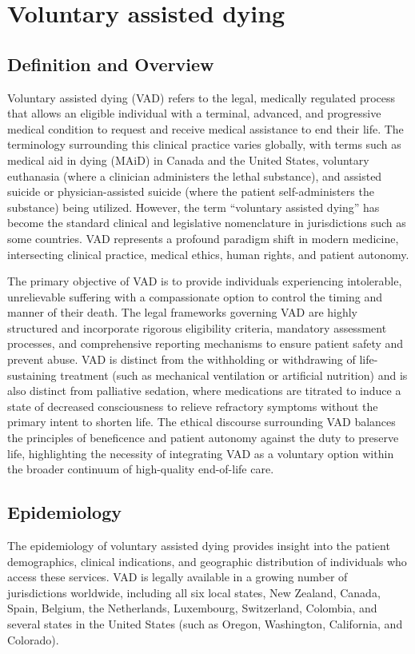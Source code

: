 \chapter{Voluntary assisted dying}

\section*{Definition and Overview}
Voluntary assisted dying (VAD) refers to the legal, medically regulated process that allows an eligible individual with a terminal, advanced, and progressive medical condition to request and receive medical assistance to end their life. The terminology surrounding this clinical practice varies globally, with terms such as medical aid in dying (MAiD) in Canada and the United States, voluntary euthanasia (where a clinician administers the lethal substance), and assisted suicide or physician-assisted suicide (where the patient self-administers the substance) being utilized. However, the term ``voluntary assisted dying'' has become the standard clinical and legislative nomenclature in jurisdictions such as some countries. VAD represents a profound paradigm shift in modern medicine, intersecting clinical practice, medical ethics, human rights, and patient autonomy.

The primary objective of VAD is to provide individuals experiencing intolerable, unrelievable suffering with a compassionate option to control the timing and manner of their death. The legal frameworks governing VAD are highly structured and incorporate rigorous eligibility criteria, mandatory assessment processes, and comprehensive reporting mechanisms to ensure patient safety and prevent abuse. VAD is distinct from the withholding or withdrawing of life-sustaining treatment (such as mechanical ventilation or artificial nutrition) and is also distinct from palliative sedation, where medications are titrated to induce a state of decreased consciousness to relieve refractory symptoms without the primary intent to shorten life. The ethical discourse surrounding VAD balances the principles of beneficence and patient autonomy against the duty to preserve life, highlighting the necessity of integrating VAD as a voluntary option within the broader continuum of high-quality end-of-life care.

\section*{Epidemiology}
The epidemiology of voluntary assisted dying provides insight into the patient demographics, clinical indications, and geographic distribution of individuals who access these services. VAD is legally available in a growing number of jurisdictions worldwide, including all six local states, New Zealand, Canada, Spain, Belgium, the Netherlands, Luxembourg, Switzerland, Colombia, and several states in the United States (such as Oregon, Washington, California, and Colorado).

